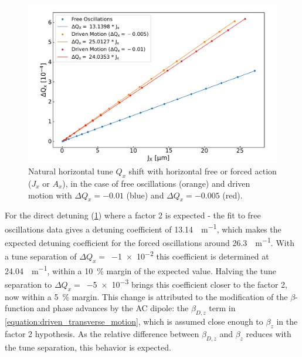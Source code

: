 \begin{figure}[!htb]
    \centering
    \includegraphics*[width=\textwidth]{Figures/Other_Studies/direct_detuning_driven_vs_free.pdf}
    \caption{Natural horizontal tune \(Q_x\) shift with horizontal free or forced action (\(J_x\) or \(A_x\)), in the case of free oscillations (\textcolor{mplorange}{orange}) and driven motion with \(\Delta Q_x = -0.01\) (\textcolor{mplblue}{blue}) and \(\Delta Q_x = -0.005\) (\textcolor{mplred}{red}).}
    \label{figure:horizontal_detuning_comparison}
\end{figure}

For the direct detuning (\cref{figure:horizontal_detuning_comparison}) where a factor \num{2} is expected - the fit to free oscillations data gives a detuning coefficient of \qty{13.14}{\micro\per\meter}, which makes the expected detuning coefficient for the forced oscillations around \qty{26.3}{\micro\per\meter}.
With a tune separation of \(\Delta Q_x =\)~\num{-1e-2} this coefficient is determined at \qty{24.04}{\micro\per\meter}, within a \qty{10}{\percent} margin of the expected value.
Halving the tune separation to \(\Delta Q_x =\)~\num{-5e-3} brings this coefficient closer to the factor \num{2}, now within a \qty{5}{\percent} margin.
This change is attributed to the modification of the \(\beta\)-function and phase advances by the AC dipole: the \(\beta_{D,z}\) term in \cref{equation:driven_transverse_motion}, which is assumed close enough to \(\beta_z\) in the factor \num{2} hypothesis.
As the relative difference between \(\beta_{D,z}\) and \(\beta_z\) reduces with the tune separation, this behavior is expected.

